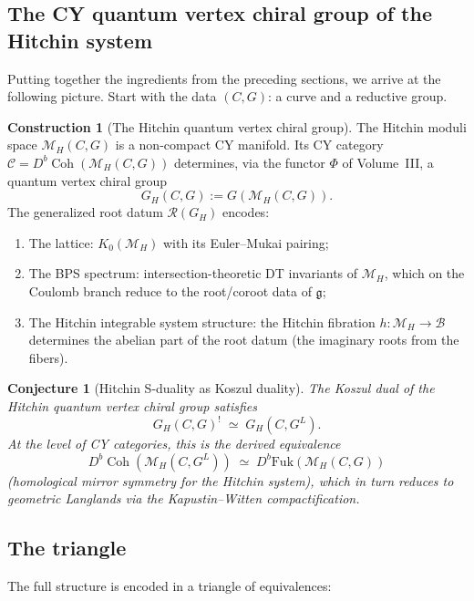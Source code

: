 \documentclass[11pt]{article}
\newtheorem{conjecture}[theorem]{Conjecture}
\theoremstyle{definition}
\newtheorem{construction}[theorem]{Construction}
\theoremstyle{remark}
\DeclareMathOperator{\Bun}{Bun}
\DeclareMathOperator{\LocSys}{LocSys}
\DeclareMathOperator{\QCoh}{QCoh}
\DeclareMathOperator{\Dmod}{D\text{-}mod}
\DeclareMathOperator{\Coh}{Coh}
\newcommand{\g}{\mathfrak{g}}
\newcommand{\gL}{\mathfrak{g}^L}
\begin{document}
\subsection{The CY quantum vertex chiral group of the Hitchin system}

Putting together the ingredients from the preceding sections, we arrive at the
following picture. Start with the data $(C, G)$: a curve and a reductive group.

\begin{construction}[The Hitchin quantum vertex chiral group]
\label{constr:hitchin-qvcg}
The Hitchin moduli space $\mathcal{M}_H(C,G)$ is a non-compact CY manifold.
Its CY category $\mathcal{C} = D^b\Coh(\mathcal{M}_H(C,G))$ determines,
via the functor $\Phi$ of Volume~III, a quantum vertex chiral group
\[
 G_H(C,G) := G(\mathcal{M}_H(C,G)).
\]
The generalized root datum $\mathcal{R}(G_H)$ encodes:
\begin{enumerate}[label=(\roman*)]
 \item The lattice: $K_0(\mathcal{M}_H)$ with its Euler--Mukai pairing;
 \item The BPS spectrum: intersection-theoretic DT invariants of
 $\mathcal{M}_H$, which on the Coulomb branch reduce to the root/coroot
 data of $\g$;
 \item The Hitchin integrable system structure: the Hitchin fibration
 $h \colon \mathcal{M}_H \to \mathcal{B}$ determines the abelian part of
 the root datum (the imaginary roots from the fibers).
\end{enumerate}
\end{construction}

\begin{conjecture}[Hitchin S-duality as Koszul duality]
\label{conj:hitchin-koszul}
The Koszul dual of the Hitchin quantum vertex chiral group satisfies
\[
 G_H(C,G)^! \;\simeq\; G_H(C,G^L).
\]
At the level of CY categories, this is the derived equivalence
\[
 D^b\Coh(\mathcal{M}_H(C,G^L))
 \;\simeq\;
 D^b\mathrm{Fuk}(\mathcal{M}_H(C,G))
\]
(homological mirror symmetry for the Hitchin system), which in turn reduces to
geometric Langlands via the Kapustin--Witten compactification.
\end{conjecture}

\subsection{The triangle}

The full structure is encoded in a triangle of equivalences:
\begin{center}
\end{center}
\end{document}
